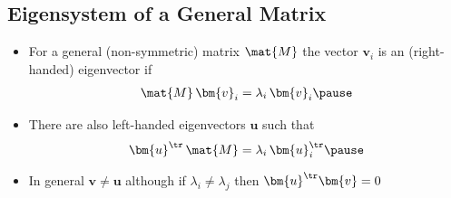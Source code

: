 
\begin{slide}
\section{Eigensystem of a General Matrix}

\begin{PauseHighLight}
  \begin{itemize}
  \item For a general (non-symmetric) matrix $\mat{M}$ the vector
    $\bm{v}_i$ is an (right-handed) eigenvector if
    \begin{align*}
      \mat{M} \,\bm{v}_i = \lambda_i \, \bm{v}_i\pause
    \end{align*}
  \item There are also left-handed eigenvectors $\bm{u}$ such that
    \begin{align*}
      \bm{u}^\tr \, \mat{M} = \lambda_i \, \bm{u}_i^\tr \pause
    \end{align*}
  \item In general $\bm{v}\neq\bm{u}$ although if
    $\lambda_i\neq\lambda_j$ then $\bm{u}^\tr \bm{v}=0$\pause

  \end{itemize}
\end{PauseHighLight}
\end{slide}


